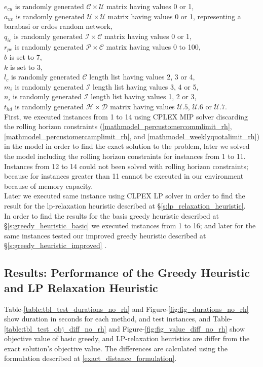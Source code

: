 \documentclass[11pt]{article}
\begin{document}
\noindent $e_{{c}{u}}$ is randomly generated $\mathcal{C} \times \mathcal{U}$ matrix having values 0 or 1,\\
\noindent $a_{{u}{v}}$ is randomly generated $\mathcal{U} \times \mathcal{U}$ matrix having values 0 or 1, representing a barabasi or erdos random network,\\
\noindent $q_{{i}{c}}$ is randomly generated $\mathcal{I} \times \mathcal{C}$ matrix having values 0 or 1,\\
\noindent $r_{{p}{c}}$ is randomly generated $\mathcal{P} \times \mathcal{C}$ matrix having values 0 to 100,\\
\noindent $b$ is set to 7,\\
\noindent $k$ is set to 3,\\
\noindent $l_c$ is randomly generated $\mathcal{C}$ length list having values 2, 3 or 4,\\
\noindent $m_i$ is randomly generated $\mathcal{I}$ length list having values 3, 4 or 5,\\
\noindent $n_i$ is randomly generated $\mathcal{I}$ length list having values 1, 2 or 3,\\
\noindent $t_{{h}{d}}$ is randomly generated $\mathcal{H} \times \mathcal{D}$ matrix having values $\mathcal{U}.5$, $\mathcal{U}.6$ or $\mathcal{U}.7$.\\

First, we executed instances from 1 to 14 using CPLEX MIP solver discarding the rolling horizon constraints (\ref{mathmodel_percustomercommlimit_rh}, \ref{mathmodel_percustomercamplimit_rh},  and \ref{mathmodel_weeklyquotalimit_rh}) in the model in order to find the exact solution to the problem, later we solved the model including the rolling horizon constraints for instances from 1 to 11. Instances from 12 to 14 could not been solved with rolling horizon constraints; because for instances greater than 11 cannot be executed in our environment because of memory capacity.\\
Later we executed same instance using CLPEX LP solver in order to find the result for the lp-relaxation heuristic described at \S \ref{s:lp_relaxation_heuristic}.\\
In order to find the results for the basis greedy heuristic described at \S \ref{s:greedy_heuristic_basic} we executed instances from 1 to 16; and later for the same instances tested our improved greedy heuristic described at \S \ref{s:greedy_heuristic_improved} .

\subsection{Results: Performance of the Greedy Heuristic and LP Relaxation Heuristic} \label{s:test_evaluation}
Table-\ref{table:tbl_test_durations_no_rh} and Figure-\ref{fig:fig_durations_no_rh} show duration in seconds for each method, and test instances, and Table-\ref{table:tbl_test_obj_diff_no_rh} and Figure-\ref{fig:fig_value_diff_no_rh} show  objective value of basic greedy, and LP-relaxation heuristics are differ from the exact solution's objective value. The differences are calculated using the formulation described at \equationautorefname \eqref{exact_distance_formulation}.\\
\end{document}
